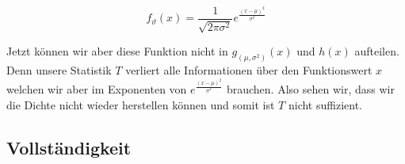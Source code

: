 \documentclass[a4paper]{article}
\begin{document}
\[
	f_\vartheta (x) = \frac{ 1 }{ \sqrt{2\pi \sigma ^2} }
	e ^{ \frac{ (x - \mu) ^2 }{ \sigma ^2 } }
\] 

Jetzt können wir aber diese Funktion nicht in $g_{(\mu, \sigma ^2)} (x)$ und
$h(x)$ aufteilen. Denn unsere Statistik $T$ verliert alle Informationen
über den Funktionswert $x$ welchen wir aber im Exponenten von
$e ^{ \frac{ (x - \mu) ^2 }{ \sigma ^2 } }$
brauchen. Also sehen wir, dass wir die Dichte nicht wieder herstellen
können und somit ist $T$ nicht suffizient.

\subsection{Vollständigkeit}
\end{document}
